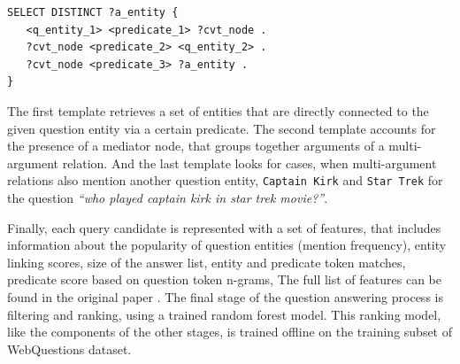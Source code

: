 \vspace{-0.25cm}
\begin{lstlisting}[frame=single,basicstyle=\small]
SELECT DISTINCT ?a_entity {
   <q_entity_1> <predicate_1> ?cvt_node .
   ?cvt_node <predicate_2> <q_entity_2> .
   ?cvt_node <predicate_3> ?a_entity .
}
\end{lstlisting}

The first template retrieves a set of entities that are directly connected to the given question entity via a certain predicate.
The second template accounts for the presence of a mediator node, that groups together arguments of a multi-argument relation.
And the last template looks for cases, when multi-argument relations also mention another question entity, \eg \texttt{Captain Kirk} and \texttt{Star Trek} for the question \textit{``who played captain kirk in star trek movie?''}.


Finally, each query candidate is represented with a set of features, that includes information about the popularity of question entities (mention frequency), entity linking scores, size of the answer list, entity and predicate token matches, predicate score based on question token n-grams, \etc
The full list of features can be found in the original paper \cite{ACCU:2015}.
The final stage of the question answering process is filtering and ranking, using a trained random forest model. This ranking model, like the components of the other stages, is trained offline on the training subset of WebQuestions dataset.

